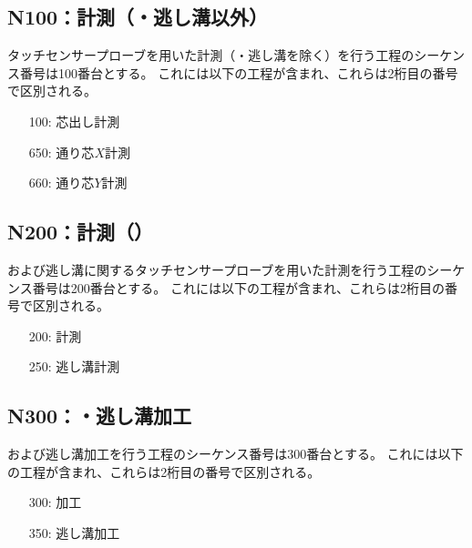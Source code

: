 \subsection{N100：計測（\dimple ・逃し溝以外）}
タッチセンサープローブを用いた計測（\dimple ・逃し溝を除く）を行う工程のシーケンス番号は100番台とする。
これには以下の工程が含まれ、これらは2桁目の番号で区別される。
\begin{enumerate}
\item[100:] 芯出し計測
\item[650:] 通り芯$X$計測
\item[660:] 通り芯$Y$計測
\end{enumerate}


\subsection{N200：計測（\dimple）}
\expandafterindex{\dimplekana@\dimple}\dimple および逃し溝に関するタッチセンサープローブを用いた計測を行う工程のシーケンス番号は200番台とする。
これには以下の工程が含まれ、これらは2桁目の番号で区別される。
\begin{enumerate}
\item[200:] \dimple 計測
\item[250:] 逃し溝計測
\end{enumerate}


\subsection{N300：\dimple ・逃し溝加工}
\dimple および逃し溝加工を行う工程のシーケンス番号は300番台とする。
これには以下の工程が含まれ、これらは2桁目の番号で区別される。
\begin{enumerate}
\item[300:] \dimple 加工
\item[350:] 逃し溝加工
\end{enumerate}


